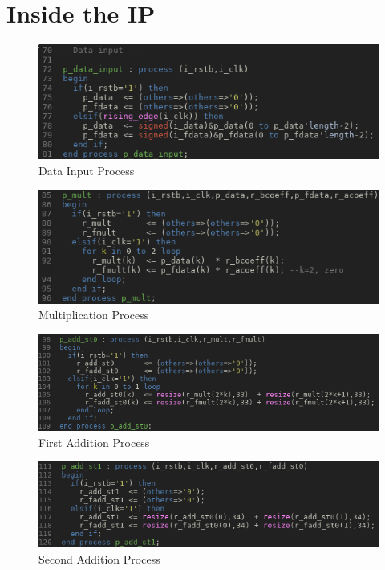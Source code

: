 \documentclass[12pt,a4paper,titlepage]{article}
\begin{document}
\section{Inside the IP}
\begin{figure}[!htb]
  \centering
  \includegraphics[width=\textwidth]
                  {../presentation/data-input.png}
                  \caption{Data Input Process}
                  \label{fig:a0}
\end{figure}
\begin{figure}[!htb]
  \centering
  \includegraphics[width=\textwidth]
                  {../presentation/mult.png}
                  \caption{Multiplication Process}
                  \label{fig:a1}
\end{figure}
\begin{figure}[!htb]
  \centering
  \includegraphics[width=\textwidth]
                  {../presentation/add0.png}
                  \caption{First Addition Process}
                  \label{fig:a2}
\end{figure}
\begin{figure}[!htb]
  \centering
  \includegraphics[width=\textwidth]
                  {../presentation/add1.png}
                  \caption{Second Addition Process}
                  \label{fig:a3}
\end{figure}
\end{document}

